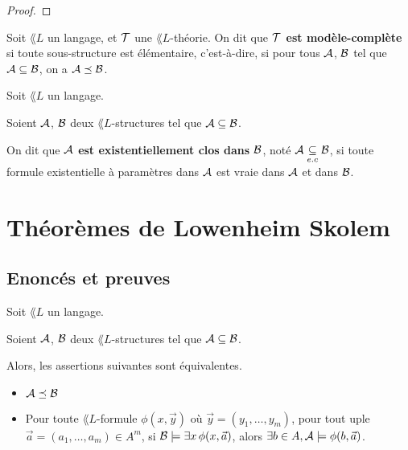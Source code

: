 \documentclass[a4paper, 12pt]{article}
\begin{document}
\begin{proof}

\end{proof}

\begin{definition} 
	Soit $\lang{L}$ un langage, et $\mathcal{T}$ une $\lang{L}$-théorie.
	On dit que \textbf{$\mathcal{T}$ est modèle-complète} si toute sous-structure
	est élémentaire, c'est-à-dire, si pour tous $\mathcal{A}$, $\mathcal{B}$ tel
	que $\mathcal{A} \subseteq \mathcal{B}$, on a $\mathcal{A}
	\preceq \mathcal{B}$.
\end{definition}

\begin{definition} 
	Soit $\lang{L}$ un langage.

	Soient $\mathcal{A}$, $\mathcal{B}$ deux $\lang{L}$-structures tel que
	$\mathcal{A} \subseteq \mathcal{B}$.

	On dit que \textbf{$\mathcal{A}$ est existentiellement clos dans
	$\mathcal{B}$}, noté $\mathcal{A} \underset{e.c}{\subseteq} \mathcal{B}$, si toute
	formule existentielle à paramètres dans $\mathcal{A}$ est vraie dans
	$\mathcal{A}$ et dans $\mathcal{B}$.
\end{definition}

\section{Théorèmes de Lowenheim Skolem}

\subsection{Enoncés et preuves}

\begin{theorem} 
	\label{theorem:tarski_vaught}
	Soit $\lang{L}$ un langage.

	Soient $\mathcal{A}$, $\mathcal{B}$ deux $\lang{L}$-structures tel que
	$\mathcal{A} \subseteq \mathcal{B}$.

	Alors, les assertions suivantes sont équivalentes.

	\begin{itemize}
		\item $\mathcal{A} \preceq \mathcal{B}$
		\item Pour toute $\lang{L}$-formule $\phi(x, \vec{y})$ où $\vec{y} =
			(y_{1}, \dots, y_{m}) $, pour tout uple $\vec{a} = (a_{1}, \dots,
			a_{m}) \in A^{m}$, si $\mathcal{B} \models \exists x \, \phi(x,
			\vec{a})$, alors $\exists b \in A, \mathcal{A} \models \phi(b,
			\vec{a})$.
	\end{itemize}
\end{theorem}
\end{document}
